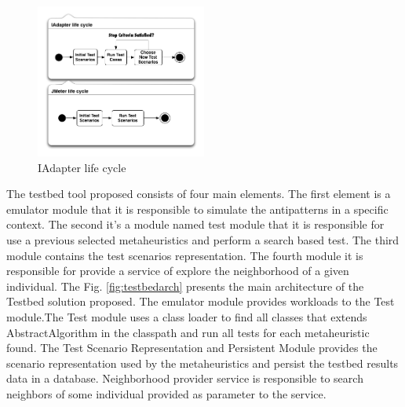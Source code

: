 \documentclass[times]{stvrauth}
\begin{document}
\begin{figure}[h]
\centering
\includegraphics[width=0.5\textwidth]{./images/lifecycle2.png}
\caption{IAdapter life cycle}
\label{fig:iadapterlifecycle}
\end{figure}


The testbed tool proposed consists of four main elements. The first element is a emulator module that it is responsible to simulate the antipatterns in a specific context. The second it's a module named test module that it is responsible for use a previous selected metaheuristics and perform a search based test. The third module contains the test scenarios representation. The fourth module it is responsible for provide a service of explore the neighborhood of a given individual. The Fig. \ref{fig:testbedarch} presents the main architecture of the Testbed solution proposed. The emulator module provides workloads to the Test module.The Test module uses a class loader to find all classes that extends AbstractAlgorithm in the classpath and run all tests for each metaheuristic found. The Test Scenario Representation and Persistent Module provides the scenario representation used by the metaheuristics and persist the testbed results data in a database. Neighborhood provider service is responsible to search neighbors of some individual provided as parameter to the service.
\end{document}

